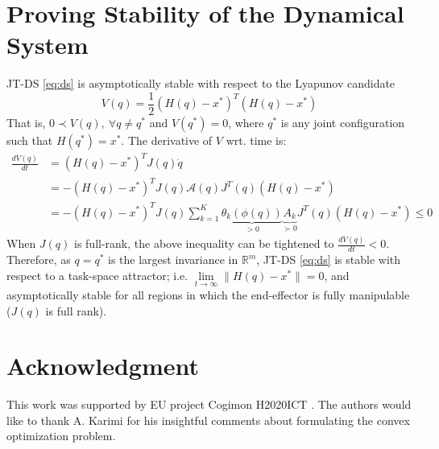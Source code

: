 \documentclass[letterpaper, 10 pt, conference,fleqn]{ieeeconf}
\begin{document}
{\footnotesize
\appendices
\section{Proving Stability of the Dynamical System}
\label{appendix:stability}
JT-DS \eqref{eq:ds} is asymptotically stable with respect to the Lyapunov candidate
\[ V(q) = \frac{1}{2}(H(q) - x^*)^T(H(q) - x^*) \]
That is, $ 0 \prec V(q),~ \forall q \neq q^*$ and $ V(q^*) = 0 $, where $q^*$ is any joint configuration such that $H(q^*) = x^*$.  The derivative of $ V $ wrt. time is:
\begin{equation}
\begin{aligned}
\frac{dV(q)}{dt} &= (H(q) - x^*)^TJ(q)\dot{q}\\
&= -(H(q) - x^*)^TJ(q)\mathcal{A}(q)J^T(q)(H(q) - x^*)\\
&= -(H(q) - x^*)^TJ(q)\sum_{k=1}^{K}\underbrace{\theta_k(\phi(q))}_{> 0}\underbrace{A_k}_{\succ 0}J^T(q)(H(q) - x^*)\leq 0
\end{aligned}
\end{equation}
When $J(q)$ is full-rank, the above inequality can be tightened to $\frac{dV(q)}{dt} < 0$. Therefore, as $ q=q^* $ is the largest invariance in $ \mathbb{R}^m $, JT-DS \eqref{eq:ds} is stable with respect to a task-space attractor; i.e. $\lim\limits_{t\rightarrow \infty} \| H(q)-x^*\|=0 $, and asymptotically stable for all regions in which the end-effector is fully manipulable ($J(q)$ is full rank).
}
\section*{Acknowledgment}
\footnotesize
This work was supported by EU project Cogimon H2020\textendash ICT . The authors would like to thank A. Karimi for his insightful comments about formulating the convex optimization problem.



%



\end{document}
